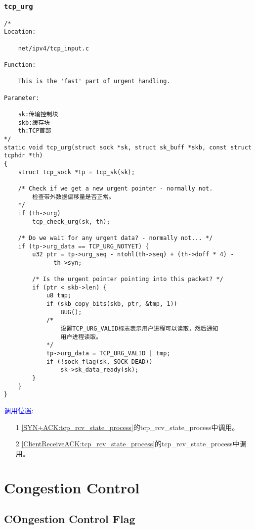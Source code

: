         \subsubsection{\texttt{tcp_urg}}
            \label{TCPUrgent:tcp_urg}
\begin{verbatim}
/*
Location:

    net/ipv4/tcp_input.c

Function:

    This is the 'fast' part of urgent handling. 

Parameter:

    sk:传输控制块
    skb:缓存块
    th:TCP首部
*/
static void tcp_urg(struct sock *sk, struct sk_buff *skb, const struct tcphdr *th)
{
    struct tcp_sock *tp = tcp_sk(sk);

    /* Check if we get a new urgent pointer - normally not. 
        检查带外数据偏移量是否正常。
    */
    if (th->urg)
        tcp_check_urg(sk, th);

    /* Do we wait for any urgent data? - normally not... */
    if (tp->urg_data == TCP_URG_NOTYET) {
        u32 ptr = tp->urg_seq - ntohl(th->seq) + (th->doff * 4) -
              th->syn;

        /* Is the urgent pointer pointing into this packet? */
        if (ptr < skb->len) {
            u8 tmp;
            if (skb_copy_bits(skb, ptr, &tmp, 1))
                BUG();
            /*
                设置TCP_URG_VALID标志表示用户进程可以读取，然后通知
                用户进程读取。
            */
            tp->urg_data = TCP_URG_VALID | tmp;
            if (!sock_flag(sk, SOCK_DEAD))
                sk->sk_data_ready(sk);
        }
    }
}
\end{verbatim}    

        \textcolor{blue}{调用位置}:

            \begin{enumerate}
                \item[1]        \ref{SYN+ACK:tcp_rcv_state_process}的tcp\_rcv\_state\_process中调用。
                \item[2]        \ref{ClientReceiveACK:tcp_rcv_state_process}的tcp\_rcv\_state\_process中调用。              
            \end{enumerate}


\section{Congestion Control}
    \subsection{COngestion Control Flag}
